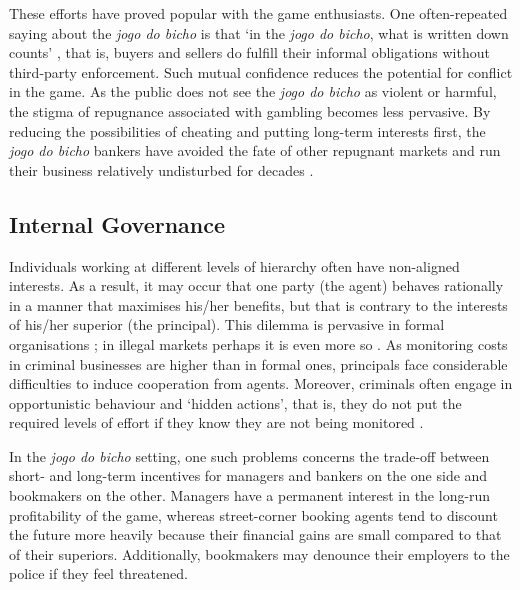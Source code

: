 
These efforts have proved popular with the game enthusiasts. One often-repeated saying about the \emph{jogo do bicho} is that `in the \emph{jogo do bicho}, what is written down counts' \citep[159]{chazkel2011laws}, that is, buyers and sellers do fulfill their informal obligations without third-party enforcement. Such mutual confidence reduces the potential for conflict in the game. As the public does not see the \emph{jogo do bicho} as violent or harmful, the stigma of repugnance associated with gambling becomes less pervasive. By reducing the possibilities of cheating and putting long-term interests first, the \emph{jogo do bicho} bankers have avoided the fate of other repugnant markets and run their business relatively undisturbed for decades \citep[20]{da1999aguias}.

\subsection{Internal Governance}
\label{sub:internal}

Individuals working at different levels of hierarchy often have non-aligned interests. As a result, it may occur that one party (the agent) behaves rationally in a manner that maximises his/her benefits, but that is contrary to the interests of his/her superior (the principal). This dilemma is pervasive in formal organisations \citep{holmstrom1979moral,jensen1976theory,moe1984new,shapiro2005agency,spence1971insurance}; in illegal markets perhaps it is even more so \citep{campana2013cooperation,gambetta2009codes,skarbek2011governance,skarbek2014social}. As monitoring costs in criminal businesses are higher than in formal ones, principals face considerable difficulties to induce cooperation from agents. Moreover, criminals often engage in opportunistic behaviour and `hidden actions', that is, they do not put the required levels of effort if they know they are not being monitored \citep[38--42]{arrow1985agency}.

In the \emph{jogo do bicho} setting, one such problems concerns the trade-off between short- and long-term incentives for managers and bankers on the one side and bookmakers on the other. Managers have a permanent interest in the long-run profitability of the game, whereas street-corner booking agents tend to discount the future more heavily because their financial gains are small compared to that of their superiors. Additionally, bookmakers may denounce their employers to the police if they feel threatened.

